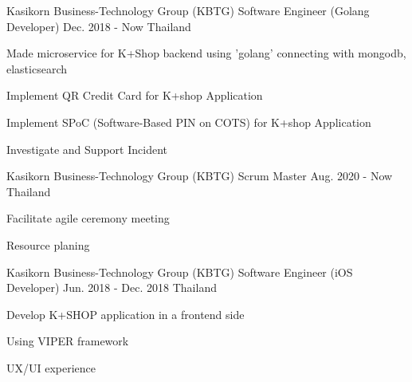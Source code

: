 

\begin{cventries}

  \cventry
    {Kasikorn Business-Technology Group (KBTG)} %
    {Software Engineer (Golang Developer)} %
    {Dec. 2018 - Now} %
    {Thailand} %
    {
      \begin{cvitems} %
        \item {Made microservice for K+Shop backend using 'golang' connecting with mongodb, elasticsearch}
        \item {Implement QR Credit Card for K+shop Application}
        \item {Implement SPoC (Software-Based PIN on COTS) for K+shop Application}
        \item {Investigate and Support Incident}
      \end{cvitems}
    }

  \cventry
    {Kasikorn Business-Technology Group (KBTG)} %
    {Scrum Master} %
    {Aug. 2020 - Now} %
    {Thailand} %
  {
    \begin{cvitems} %
      \item {Facilitate agile ceremony meeting} %
      \item {Resource planing}
    \end{cvitems}
  }

  \cventry
    {Kasikorn Business-Technology Group (KBTG)} %
    {Software Engineer (iOS Developer)} %
    {Jun. 2018 - Dec. 2018} %
    {Thailand} %
    {
      \begin{cvitems} %
        \item {Develop K+SHOP application in a frontend side}
        \item {Using VIPER framework}
        \item {UX/UI experience}
      \end{cvitems}
    }


\end{cventries}
